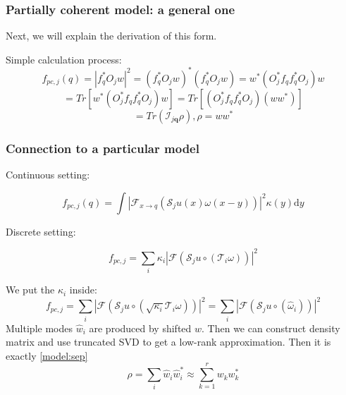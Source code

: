 \documentclass[UTF8]{beamer}
\begin{document}
\begin{frame} \frametitle{Partially coherent model: a general one}
Next, we will explain the derivation of this form.

 Simple calculation process:
$$
f_{pc,j}(q) = |f_q^*O_j w|^2 = (f_q^*O_j w)^*(f_q^*O_j w) = w^*(O_j^*f_qf_q^*O_j)w
$$
$$
=Tr[w^*(O_j^*f_qf_q^*O_j)w]=Tr[(O_j^*f_qf_q^*O_j) (ww^*)]
$$
$$
=Tr(  \mathcal{I}_{j \mathbf{q}} \rho ),
\rho = ww^*
$$

\end{frame}




\begin{frame} \frametitle{Connection to a particular model}

Continuous setting:

\begin{equation}
f_{p c, j}(q) = \int\left|\mathcal{F}_{x \rightarrow q}\left(\mathcal{S}_{j} u(x) \omega(x-y)\right)\right|^{2} \kappa(y) \mathrm{d} y
\end{equation}

Discrete setting:

\begin{equation}
f_{p c, j}=\sum_{i} \kappa_{i}\left|\mathcal{F}\left( \mathcal{S}_{j} u \circ \left(\mathcal{T}_{i} \omega\right) \right)\right|^{2}
\label{model:target}
\end{equation}

 We put the $\kappa_{i}$ inside:
\begin{equation}
f_{p c, j}=\sum_{i} \left|\mathcal{F}\left( \mathcal{S}_{j} u \circ \left( \sqrt{\kappa_{i}}\mathcal{T}_{i} \omega\right) \right)\right|^{2}
=
\sum_{i} \left|\mathcal{F}\left( \mathcal{S}_{j} u \circ \left( \hat{\omega}_i\right) \right)\right|^{2}
\end{equation}
Multiple modes $\hat{w}_i$ are produced by shifted $w$. Then we can construct density matrix and use truncated SVD to get a low-rank approximation. Then it is exactly \eqref{model:sep}
$$
\rho = \sum_i \hat{w}_i \hat{w}_i^* \approx \sum_{k=1}^{r} w_k w_k^* 
$$

\end{frame}
\end{document}
